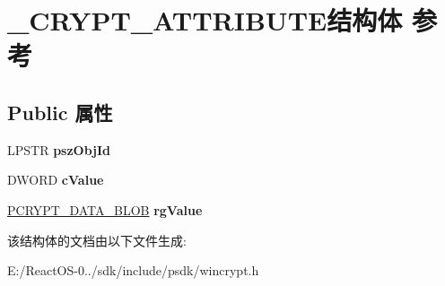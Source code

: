 \hypertarget{struct___c_r_y_p_t___a_t_t_r_i_b_u_t_e}{}\section{\+\_\+\+C\+R\+Y\+P\+T\+\_\+\+A\+T\+T\+R\+I\+B\+U\+T\+E结构体 参考}
\label{struct___c_r_y_p_t___a_t_t_r_i_b_u_t_e}
\subsection*{Public 属性}
\begin{DoxyCompactItemize}
\item 
\mbox{\label{struct___c_r_y_p_t___a_t_t_r_i_b_u_t_e_afb073dc65bc0a965cd9d68a2b65841e8}} 
L\+P\+S\+TR {\bfseries psz\+Obj\+Id}
\item 
\mbox{\label{struct___c_r_y_p_t___a_t_t_r_i_b_u_t_e_a9a16a9e574dd12aceba4e0a808ff2b1f}} 
D\+W\+O\+RD {\bfseries c\+Value}
\item 
\mbox{\label{struct___c_r_y_p_t___a_t_t_r_i_b_u_t_e_ab0ab1d5ad9f5d140e43098112fef6977}} 
\hyperlink{struct___c_r_y_p_t_o_a_p_i___b_l_o_b}{P\+C\+R\+Y\+P\+T\+\_\+\+D\+A\+T\+A\+\_\+\+B\+L\+OB} {\bfseries rg\+Value}
\end{DoxyCompactItemize}


该结构体的文档由以下文件生成\+:\begin{DoxyCompactItemize}
\item 
E\+:/\+React\+O\+S-\/0../sdk/include/psdk/wincrypt.\+h\end{DoxyCompactItemize}
